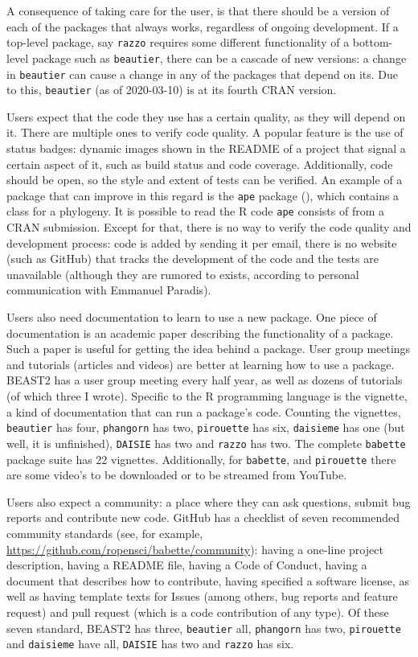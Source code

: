 A consequence of taking care for the user, is that there should be
a version of each of the packages that always works, regardless of ongoing
development. If a top-level package, say \verb;razzo; requires some different 
functionality of a bottom-level package such as \verb;beautier;, there
can be a cascade of new versions: a change in \verb;beautier; 
can cause a change in any of the packages that depend on its.
Due to this, \verb;beautier; (as of 2020-03-10) is at its fourth CRAN version.

Users expect that the code they use has a certain quality,
as they will depend on it. There are multiple ones to verify
code quality. A popular feature is the use of status badges: 
dynamic images shown in the README of a project that 
signal a certain aspect of it, such as build status and code coverage.
Additionally, code should be open, so the style and extent of tests can
be verified. An example of a package that can improve in this
regard is the \verb;ape; package (\cite{ape}), which contains
a class for a phylogeny. It is possible to read the R code \verb;ape; consists
of from a CRAN submission. Except for that, there is no way to 
verify the code quality and development process: code is added by sending 
it per email, there is no website (such as
GitHub) that tracks the development of the code and the tests are 
unavailable (although they are rumored to exists, according to personal 
communication with Emmanuel Paradis). 

Users also need documentation to learn to use a new package.
One piece of documentation is an academic paper describing the functionality
of a package. Such a paper is useful for getting the idea behind a package.
User group meetings and tutorials (articles and videos) are better at
learning how to use a package. BEAST2 has a user group meeting every half year,
as well as dozens of tutorials (of which three I wrote). Specific to
the R programming language is the vignette, a kind of documentation that
can run a package's code. Counting the vignettes, \verb;beautier; has four, 
\verb;phangorn; has two, \verb;pirouette; has six, \verb;daisieme; has one (but well,
it is unfinished), \verb;DAISIE; has two and \verb;razzo; has two. 
The complete \verb;babette; package suite has
22 vignettes.
Additionally, for \verb;babette;, and \verb;pirouette; there are some video's to
be downloaded or to be streamed from YouTube.

Users also expect a community: a place where they can ask questions,
submit bug reports and contribute new code. GitHub has a checklist of
seven recommended community standards (see, for 
example, \url{https://github.com/ropensci/babette/community}): having 
a one-line project description, 
having a README file, having a Code of Conduct, having a
document that describes how to contribute, having specified a software license, 
as well as having template texts for Issues (among others, bug reports
and feature request) and pull request (which is a code contribution of any type).
Of these seven standard, BEAST2 has three, 
\verb;beautier; all, \verb;phangorn; has two, \verb;pirouette; and \verb;daisieme; have all,
\verb;DAISIE; has two and \verb;razzo; has six.

